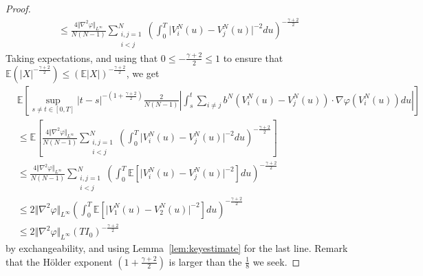 \documentclass[11pt,a4paper]{article}
\theoremstyle{definition}
\theoremstyle{plain}
\begin{document}
\begin{proof}
\begin{multline*}
    \leq \frac{4\Vert \nabla^2 \varphi\Vert_{L^\infty}}{N(N-1)}\sum_{\substack{i,j=1\\ i<j}}^N \left(\int_0^T   \vert V^N_i(u)-V^N_j(u) \vert^{-2}du\right)^{-\frac{\gamma+2}{2}}
\end{multline*}
Taking expectations, and using that $0\leq -\frac{\gamma+2}{2} \leq 1$ to ensure that $\mathbb{E}(\vert X\vert^{-\frac{\gamma+2}{2}}) \leq (\mathbb{E}\vert X\vert)^{-\frac{\gamma+2}{2}}$, we get
\begin{align}
    &\mathbb{E}\left[\sup_{s\neq t\in[0,T]} \vert t-s\vert^{-(1+\frac{\gamma+2}{2})}\frac{2}{N(N-1)}\left\vert \int_s^t \sum_{i \neq j}  b^N\left(V^N_i(u) -V^N_j(u)\right) \cdot \nabla\varphi\left(V^N_i(u)\right) du \right\vert\right]\nonumber\\
    &\leq \mathbb{E}\left[\frac{4\Vert \nabla^2 \varphi\Vert_{L^\infty}}{N(N-1)}\sum_{\substack{i,j=1\\ i<j}}^N \left(\int_0^T   \vert V^N_i(u)-V^N_j(u) \vert^{-2}du\right)^{-\frac{\gamma+2}{2}}\right]\nonumber\\
    &\leq \frac{4\Vert \nabla^2 \varphi\Vert_{L^\infty}}{N(N-1)}\sum_{\substack{i,j=1\\ i<j}}^N \left(\int_0^T   \mathbb{E}\left[\vert V^N_i(u)-V^N_j(u) \vert^{-2}\right]du\right)^{-\frac{\gamma+2}{2}}\nonumber\\
    &\leq 2\Vert \nabla^2 \varphi\Vert_{L^\infty}\left(\int_0^T   \mathbb{E}\left[\vert V^N_1(u)-V^N_2(u) \vert^{-2}\right]du\right)^{-\frac{\gamma+2}{2}}\nonumber\\
    \label{eq:tightcond2}
    &\leq 2\Vert \nabla^2 \varphi\Vert_{L^\infty}\left(TI_0\right)^{-\frac{\gamma+2}{2}}
\end{align}
by exchangeability, and using Lemma~\ref{lem:keyestimate} for the last line. Remark that the Hölder exponent $(1+\frac{\gamma+2}{2})$ is larger than the $\frac{1}{8}$ we seek.


\end{proof}
\end{document}
